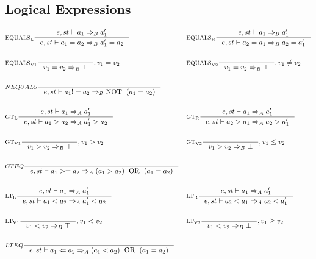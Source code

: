 \subsection{Logical Expressions}
\begin{align*}
&\inference[$\text{EQUALS}_\text{L}$]{e,st \vdash a_1 \Rightarrow_B a_1'}
                    {e,st \vdash a_1 = a_2 \Rightarrow_B a_1' = a_2}
&
&\inference[$\text{EQUALS}_\text{R}$]{e,st \vdash a_1 \Rightarrow_B a_1'}
                    {e,st \vdash a_2 = a_1 \Rightarrow_B a_2 = a_1'}
\\\\
&\inference[$\text{EQUALS}_\text{V1}$]{}
                    {v_1 = v_2 \Rightarrow_B \top}
										{, v_1 = v_2}
&
&\inference[$\text{EQUALS}_\text{V2}$]{}
                    {v_1 = v_2 \Rightarrow_B \bot}
										{, v_1 \neq v_2}
\\\\
&\inference[$NEQUALS$]{}
                    {e,st \vdash a_1 != a_2 \Rightarrow_B \Tnot (a_1 = a_2)}
\\\\
&\inference[$\text{GT}_\text{L}$]{e,st \vdash a_1 \Rightarrow_A a_1'}
                    {e,st \vdash a_1 > a_2 \Rightarrow_A a_1' > a_2}
&
&\inference[$\text{GT}_\text{R}$]{e,st \vdash a_1 \Rightarrow_A a_1'}
                    {e,st \vdash a_2 > a_1 \Rightarrow_A a_2 > a_1'}
\\\\
&\inference[$\text{GT}_\text{V1}$]{}
                    {v_1 > v_2 \Rightarrow_B \top}
										{, v_1 > v_2}
&
&\inference[$\text{GT}_\text{V2}$]{}
                    {v_1 > v_2 \Rightarrow_B \bot}
										{, v_1 \leq v_2}
\\\\
&\inference[$GTEQ$]{}
                    {e,st \vdash a_1 >= a_2 \Rightarrow_A (a_1 > a_2) \Tor (a_1 = a_2)}
\\\\
&\inference[$\text{LT}_\text{L}$]{e,st \vdash a_1 \Rightarrow_A a_1'}
                    {e,st \vdash a_1 < a_2 \Rightarrow_A a_1' < a_2}
&
&\inference[$\text{LT}_\text{R}$]{e,st \vdash a_1 \Rightarrow_A a_1'}
                    {e,st \vdash a_2 < a_1 \Rightarrow_A a_2 < a_1'}
\\\\
&\inference[$\text{LT}_\text{V1}$]{}
                    {v_1 < v_2 \Rightarrow_B \top}
										{, v_1 < v_2}
&
&\inference[$\text{LT}_\text{V2}$]{}
                    {v_1 < v_2 \Rightarrow_B \bot}
										{, v_1 \geq v_2}
\\\\
&\inference[$LTEQ$]{}
                    {e,st \vdash a_1 <= a_2 \Rightarrow_A (a_1 < a_2) \Tor (a_1 = a_2)}
\end{align*}

